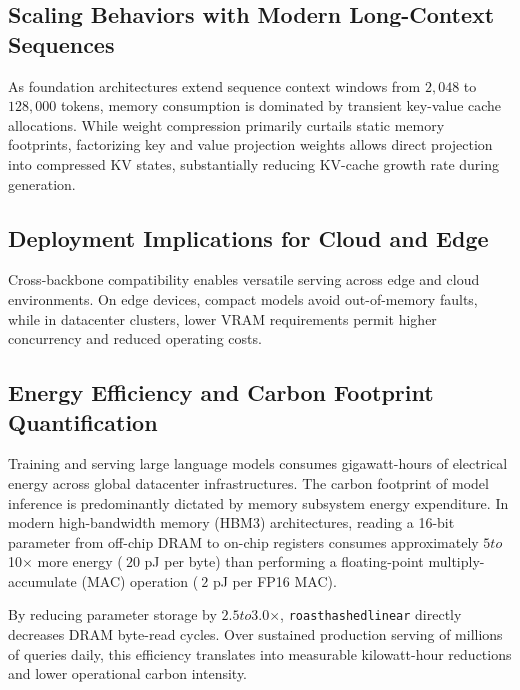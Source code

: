 \subsection{Scaling Behaviors with Modern Long-Context Sequences}
As foundation architectures extend sequence context windows from $2{,}048$ to $128{,}000$ tokens, memory consumption is dominated by transient key-value cache allocations. While weight compression primarily curtails static memory footprints, factorizing key and value projection weights allows direct projection into compressed KV states, substantially reducing KV-cache growth rate during generation.

\subsection{Deployment Implications for Cloud and Edge}
Cross-backbone compatibility enables versatile serving across edge and cloud environments. On edge devices, compact models avoid out-of-memory faults, while in datacenter clusters, lower VRAM requirements permit higher concurrency and reduced operating costs.

\subsection{Energy Efficiency and Carbon Footprint Quantification}
Training and serving large language models consumes gigawatt-hours of electrical energy across global datacenter infrastructures. The carbon footprint of model inference is predominantly dictated by memory subsystem energy expenditure. In modern high-bandwidth memory (HBM3) architectures, reading a 16-bit parameter from off-chip DRAM to on-chip registers consumes approximately $5$\times$ to $10$\times$ more energy ($~20$ pJ per byte) than performing a floating-point multiply-accumulate (MAC) operation ($~2$ pJ per FP16 MAC).

By reducing parameter storage by $2.5$\times$ to $3.0$\times$, \texttt{roasthashedlinear} directly decreases DRAM byte-read cycles. Over sustained production serving of millions of queries daily, this efficiency translates into measurable kilowatt-hour reductions and lower operational carbon intensity.
